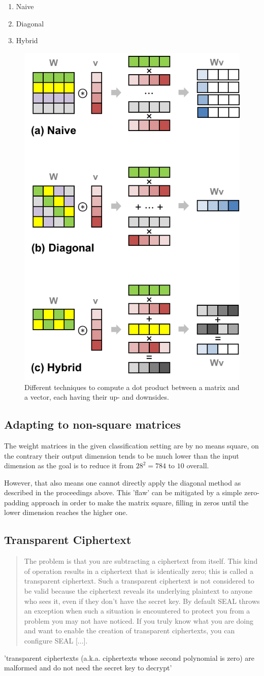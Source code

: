 \begin{enumerate}
  \item Naive
  \item Diagonal
  \item Hybrid
\end{enumerate}

\begin{figure}
  \centering
  \includegraphics[width=0.4\linewidth]{figures/matrix-vector-multiplication-techniques.png}
  \caption[Image source: \cite{2018-gazelle}]{Different techniques to compute a dot product between a matrix and a vector,
    each having their up- and downsides.}
\end{figure}

\subsection{Adapting to non-square matrices}
The weight matrices in the given classification setting
are by no means square, on the contrary their output dimension tends
to be much lower than the input dimension as the goal is to reduce it from
$28^2 = 784$ to $10$ overall.

However, that also means one cannot directly apply the diagonal method
as described in the proceedings above.
This 'flaw' can be mitigated by a simple zero-padding approach
in order to make the matrix square, filling in zeros until
the lower dimension reaches the higher one.

\subsection{Transparent Ciphertext}
\begin{quote}
  The problem is that you are subtracting a ciphertext from itself.
  This kind of operation results in a ciphertext that is identically zero;
  this is called a transparent ciphertext. Such a transparent ciphertext
  is not considered to be valid because the ciphertext reveals its underlying plaintext to anyone who sees it,
  even if they don't have the secret key.
  By default SEAL throws an exception when such a situation is encountered to protect you from a problem you may not have noticed.
  If you truly know what you are doing and want to enable the creation of transparent ciphertexts,
  you can configure SEAL [...].
  \parencite{kim-laine-on-transparent-ciphertexts}
\end{quote}

'transparent ciphertexts (a.k.a. ciphertexts whose second polynomial is zero) are malformed and do not need the secret key to decrypt'
